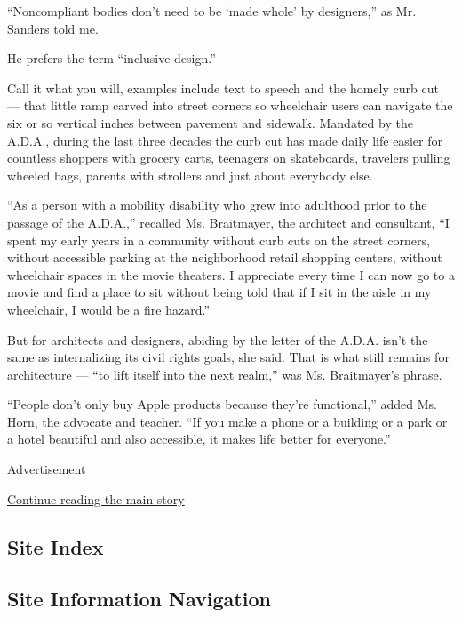 ``Noncompliant bodies don't need to be `made whole' by designers,'' as
Mr. Sanders told me.

He prefers the term ``inclusive design.''

Call it what you will, examples include text to speech and the homely
curb cut --- that little ramp carved into street corners so wheelchair
users can navigate the six or so vertical inches between pavement and
sidewalk. Mandated by the A.D.A., during the last three decades the curb
cut has made daily life easier for countless shoppers with grocery
carts, teenagers on skateboards, travelers pulling wheeled bags, parents
with strollers and just about everybody else.

``As a person with a mobility disability who grew into adulthood prior
to the passage of the A.D.A.,'' recalled Ms. Braitmayer, the architect
and consultant, ``I spent my early years in a community without curb
cuts on the street corners, without accessible parking at the
neighborhood retail shopping centers, without wheelchair spaces in the
movie theaters. I appreciate every time I can now go to a movie and find
a place to sit without being told that if I sit in the aisle in my
wheelchair, I would be a fire hazard.''

But for architects and designers, abiding by the letter of the A.D.A.
isn't the same as internalizing its civil rights goals, she said. That
is what still remains for architecture --- ``to lift itself into the
next realm,'' was Ms. Braitmayer's phrase.

``People don't only buy Apple products because they're functional,''
added Ms. Horn, the advocate and teacher. ``If you make a phone or a
building or a park or a hotel beautiful and also accessible, it makes
life better for everyone.''

Advertisement

\protect\hyperlink{after-bottom}{Continue reading the main story}

\hypertarget{site-index}{%
\subsection{Site Index}\label{site-index}}

\hypertarget{site-information-navigation}{%
\subsection{Site Information
Navigation}\label{site-information-navigation}}

